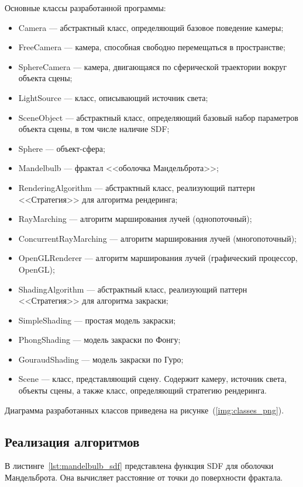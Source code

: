 Основные классы разработанной программы:
\begin{itemize}
  \item Camera --- абстрактный класс, определяющий базовое поведение камеры;
  \item FreeCamera --- камера, способная свободно перемещаться в пространстве;
  \item SphereCamera --- камера, двигающаяся по сферической траектории вокруг объекта сцены;
  \item LightSource --- класс, описывающий источник света;
  \item SceneObject --- абстрактный класс, определяющий базовый набор параметров объекта сцены, в том числе наличие SDF;
  \item Sphere --- объект-сфера;
  \item Mandelbulb --- фрактал <<оболочка Мандельброта>>;
  \item RenderingAlgorithm --- абстрактный класс, реализующий паттерн <<Стратегия>> для алгоритма рендеринга;
  \item RayMarching --- алгоритм марширования лучей (однопоточный);
  \item ConcurrentRayMarching --- алгоритм марширования лучей (многопоточный);
  \item OpenGLRenderer --- алгоритм марширования лучей (графический процессор, OpenGL);
  \item ShadingAlgorithm --- абстрактный класс, реализующий паттерн <<Стратегия>> для алгоритма закраски;
  \item SimpleShading --- простая модель закраски;
  \item PhongShading --- модель закраски по Фонгу;
  \item GouraudShading --- модель закраски по Гуро;
  \item Scene --- класс, представляющий сцену. Содержит камеру, источник света, объекты сцены, а также класс, определяющий стратегию рендеринга.
\end{itemize}

Диаграмма разработанных классов приведена на рисунке~(\ref{img:classes_png}).


\clearpage
\subsection{Реализация алгоритмов}

В листинге~\ref{lst:mandelbulb_sdf} представлена функция SDF для оболочки Мандельброта.
Она вычисляет расстояние от точки до поверхности фрактала.

